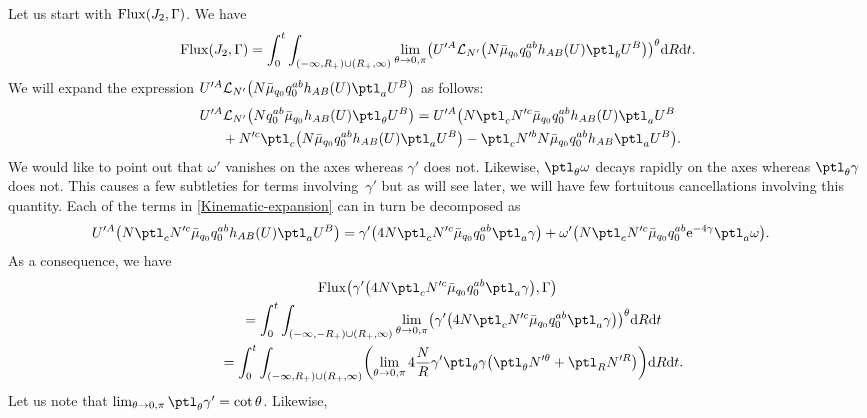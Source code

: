 Let us start with ${\rm Flux} (J_2, \Gamma)$. We have
\begin{align*}
{\rm Flux}(J_2, \Gamma)= \int^t_0 \int_{ (-\infty, R_+) \cup (R_+, \infty) } \lim_{\theta \to 0, \pi} \bigl( U'^A \mathcal{L}_{N'} \bigl(N \bar{\mu}_{q_0} q^{ab}_0 h_{AB}(U) \ptl_b U^B\bigr) \bigr)^\theta {\rm d}R {\rm d}t .\notag
\end{align*}
We will expand the expression $U'^A \mathcal{L}_{N'} \bigl(N \bar{\mu}_{q_0} q_0^{ab} h_{AB}(U) \ptl_a U^B\bigr)$ as follows:
\begin{gather}
U'^A \mathcal{L}_{N'} \bigl(N q^{ab}_0\bar{\mu}_{q_0} h_{AB}(U) \ptl_\theta U^B \bigr)= U'^A \bigl(N \ptl_c N'^c \bar{\mu}_{q_0} q^{ab}_0 h_{AB}(U) \ptl_a U^B \notag\\
\qquad{}+ N'^c \ptl_c \bigl(N \bar{\mu}_{q_0} q_0^{ab} h_{AB}(U) \ptl_a U^B\bigr) - \ptl_c N'^b N \bar{\mu}_{q_0} q^{ab}_0 h_{AB} \ptl_a U^B\bigr).\label{Kinematic-expansion}
\end{gather}
We would like to point out that $\omega'$ vanishes on the axes whereas $\gamma'$ does not. Likewise, $\ptl_\theta \omega$ decays rapidly on the axes whereas $\ptl_\theta \gamma$ does not. This causes a few subtleties for terms involving~$\gamma'$ but as will see later, we will have few fortuitous cancellations involving this quantity.
Each of the terms in \eqref{Kinematic-expansion} can in turn be decomposed as
\begin{align*}
U'^A \bigl(N \ptl_c N'^c \bar{\mu}_{q_0} q^{ab}_0 h_{AB}(U) \ptl_a U^B\bigr) &{}= \gamma' \bigl(4 N \ptl_c N'^c \bar{\mu}_{q_0} q^{ab} _0 \ptl_a \gamma\bigr)
 + \omega' \bigl(N \ptl_c N'^c \bar{\mu}_{q_0} q^{ab} _0 {\rm e}^{-4 \gamma} \ptl_a \omega\bigr).
\end{align*}
As a consequence, we have
\begin{gather}
{\rm Flux} \bigl(\gamma' \bigl(4 N \ptl_c N'^c \bar{\mu}_{q_0} q^{ab} _0 \ptl_a \gamma\bigr), \Gamma\bigr) \notag\\
\qquad{}= \int^t_0 \int_{ (-\infty, -R_+) \cup (R_+, \infty) } \lim_{\theta \to 0, \pi} \bigl(\gamma' \bigl(4 N \ptl_c N'^c \bar{\mu}_{q_0} q^{ab} _0 \ptl_a \gamma\bigr) \bigr)^\theta {\rm d}R {\rm d}t \notag\\
\qquad{}= \int^t_0 \int_{ (-\infty, R_+) \cup (R_+, \infty) } \biggl( \lim_{\theta \to 0, \pi} 4 \frac{N}{R} \gamma' \ptl_\theta \gamma \bigl(\ptl_\theta N'^\theta + \ptl_R N'^R\bigr) \biggr) {\rm d}R {\rm d}t.\label{kin-flux-axes-1}
\end{gather}
Let us note that $\lim_{\theta \to 0, \pi} \ptl_\theta \gamma' = \cot \theta$. Likewise,

